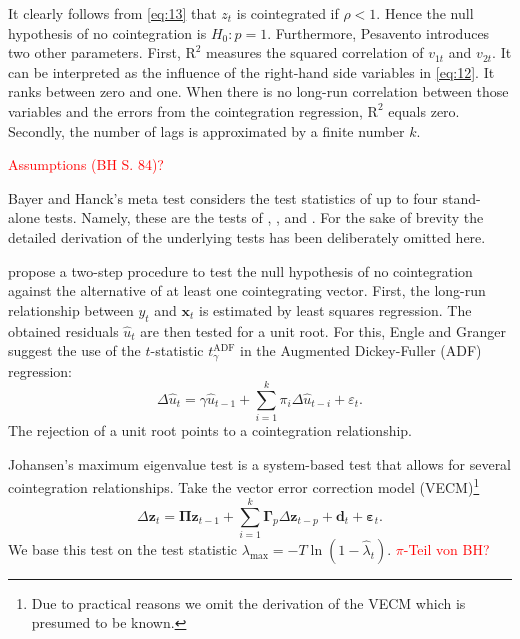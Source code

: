 \documentclass[12pt,a4paper]{article}
\let\rmarkdownfootnote\footnote%
\def\footnote{\protect\rmarkdownfootnote}
\begin{document}
It clearly follows from \eqref{eq:13} that \(z_t\) is cointegrated if
\(\rho < 1\). Hence the null hypothesis of no cointegration is
\(H_0: p = 1\). Furthermore, Pesavento introduces two other parameters.
First, \(\text{R}^2\) measures the squared correlation of \(v_{1t}\) and
\(v_{2t}\). It can be interpreted as the influence of the right-hand
side variables in \eqref{eq:12}. It ranks between zero and one. When
there is no long-run correlation between those variables and the errors
from the cointegration regression, \(\text{R}^2\) equals zero. Secondly,
the number of lags is approximated by a finite number \(k\).

\textcolor{red}{Assumptions (BH S. 84)?}

Bayer and Hanck's \autocite*{Bayerhanck_2012} meta test considers the
test statistics of up to four stand-alone tests. Namely, these are the
tests of \textcite{Englegranger_1987}, \textcite{Johansen_1988},
\textcite{Boswijk_1994} and \textcite{Banerjee_1998}. For the sake of
brevity the detailed derivation of the underlying tests has been
deliberately omitted here.

\textcite{Englegranger_1987} propose a two-step procedure to test the
null hypothesis of no cointegration against the alternative of at least
one cointegrating vector. First, the long-run relationship between
\(y_t\) and \(\mathbf{x}_t\) is estimated by least squares regression.
The obtained residuals \(\hat{u}_t\) are then tested for a unit root.
For this, Engle and Granger suggest the use of the \(t\)-statistic
\(t^{\text{ADF}}_\gamma\) in the Augmented Dickey-Fuller (ADF)
regression: \begin{equation}
\Delta \hat{u}_t = \gamma \hat{u}_{t-1} + \sum^{k}_{i=1} \pi_i \Delta \hat{u}_{t-i} + \varepsilon_t.
\label{eq:2}
\end{equation} The rejection of a unit root points to a cointegration
relationship.

Johansen's \autocite*{Johansen_1988} maximum eigenvalue test is a
system-based test that allows for several cointegration relationships.
Take the vector error correction model (VECM)\footnote{Due to practical
  reasons we omit the derivation of the VECM which is presumed to be
  known.} \begin{equation}
\Delta \mathbf{z}_t = \mathbf{\Pi z}_{t-1} + \sum^{k}_{i = 1} \mathbf{\Gamma}_p \Delta \mathbf{z}_{t-p} + \mathbf{d}_t + \mathbf{\varepsilon}_t.
\label{eq:3}
\end{equation} We base this test on the test statistic
\(\lambda_{\text{max}} = -T \ln(1 - \hat{\lambda}_t)\).
\textcolor{red}{$\pi$-Teil von BH?}
\end{document}
